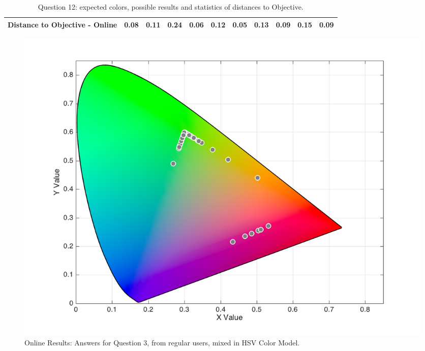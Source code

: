 \begin{table}[H]
{\begin{tabular}{lccccccccccccc}
    \multicolumn{4}{l}{Distance to Objective - Online}                                                                                               & \multicolumn{1}{|c}{\textbf{0.08}}        & \multicolumn{1}{c|}{0.11}    & \multicolumn{1}{|c}{0.24}        & \multicolumn{1}{c|}{0.06}    & \multicolumn{1}{|c}{0.12}       & \multicolumn{1}{c|}{0.05}    & \multicolumn{1}{|c}{0.13}        & \multicolumn{1}{c|}{0.09}    & \multicolumn{1}{|c}{0.15}       & \multicolumn{1}{c|}{0.09}    \\ \hline
    \end{tabular}}
  \caption[Question 12, with expected Results.]{Question 12: expected colors, possible results and statistics of distances to Objective.}
  \label{table:lab_q12_expected}
\end{table}
%
\begin{figure}[htbp]
  \centering
  \begin{minipage}{0.48\textwidth}
    \centering
    \includegraphics[width=\textwidth]{images/results/3_online_HSVresponses.png}
    \caption[Online Results: Answers for Question 3, from regular users, mixed in HSV Color Model.]{Online Results: Answers for Question 3, from regular users, mixed in HSV Color Model.}
    \label{fig:onlinehsvregular_3}
  \end{minipage}\hfill
  \begin{minipage}{0.48\textwidth}
    \centering

\end{minipage}
\end{figure}
